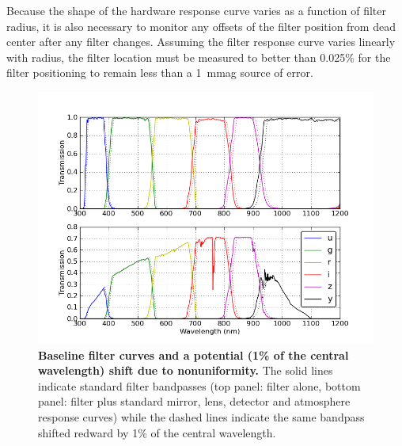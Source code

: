 \documentclass[12pt,preprint]{aastex}
\begin{document}
Because the shape of the hardware response curve varies as a function
of filter radius, it is also necessary to monitor any offsets of the
filter position from dead center after any filter changes. Assuming
the filter response curve varies linearly with radius, the filter
location must be measured to better than 0.025\%  for the filter
positioning to remain less than a 1~mmag source of error. 

\begin{figure}
\centering
\includegraphics[width=6in]{filter_shifts}
\caption{{\small 
{\bf Baseline filter curves and a potential (1\% of the central
  wavelength) shift due to nonuniformity.}
The solid lines indicate standard filter bandpasses (top panel: filter
alone, bottom panel: filter plus standard mirror, lens, detector and atmosphere
response curves) while the dashed lines indicate the same bandpass
shifted redward by 1\% of the central wavelength.}}
\label{fig:filtershift}
\end{figure}
\end{document}
